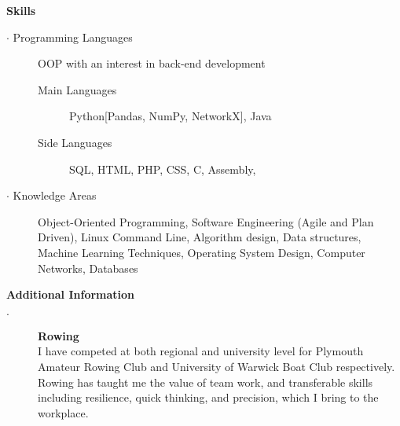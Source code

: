 \documentclass[12pt, a4paper]{article}
\begin{document}
\textbf{Skills}
  \begin{description}
    \item[$\cdot$ Programming Languages] OOP with an interest in back-end development
    \begin{description}
      \item[Main Languages] Python[Pandas, NumPy, NetworkX], Java
      \item[Side Languages] SQL, HTML, PHP, CSS, C, Assembly,
    \end{description}
    \item[$\cdot$ Knowledge Areas] Object-Oriented Programming, Software Engineering (Agile and Plan Driven), Linux Command Line, Algorithm design, Data structures, Machine Learning Techniques, Operating System Design, Computer Networks, Databases
  \end{description}
\bigskip

  \textbf{Additional Information}
    \begin{description}
      \item[$\cdot$] \textbf{Rowing} \\I have competed at both regional and university level for Plymouth Amateur Rowing Club and University of Warwick Boat Club respectively. Rowing has taught me the value of team work, and transferable skills including resilience, quick thinking, and precision, which I bring to the workplace.

      \iffalse
      Time management $\cdot$ Team work $\cdot$ Resilience $\cdot$ Motivational skills $\cdot$ Quick thinking \\ $\cdot$ Technical planning $\cdot$ Precision
      \fi
    \end{description}
\end{document}
